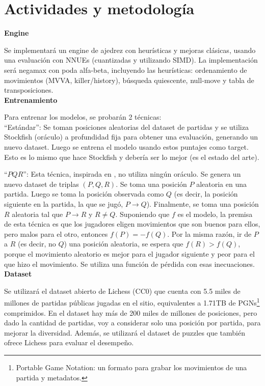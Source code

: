 \newpage
\section*{Actividades y metodología}

\textbf{Engine}

Se implementará un engine de ajedrez con heurísticas y mejoras clásicas, usando una evaluación con NNUEs (cuantizadas y utilizando SIMD). La implementación será negamax con poda alfa-beta, incluyendo las heurísticas: ordenamiento de movimientos (MVVA, killer/history), búsqueda quiescente, null-move y tabla de transposiciones. \\

\textbf{Entrenamiento}

Para entrenar los modelos, se probarán 2 técnicas: \\

``Estándar'': Se toman posiciones aleatorias del dataset de partidas y se utiliza Stockfish (oráculo) a profundidad fija para obtener una evaluación, generando un nuevo dataset. Luego se entrena el modelo usando estos puntajes como target. Esto es lo mismo que hace Stockfish y debería ser lo mejor (es el estado del arte).

``$PQR$'': Esta técnica, inspirada en \cite{dlchess:2014}, no utiliza ningún oráculo. Se genera un nuevo dataset de triplas $(P,Q,R)$. Se toma una posición $P$ aleatoria en una partida. Luego se toma la posición observada como $Q$ (es decir, la posición siguiente en la partida, la que se jugó, $P \rightarrow Q$). Finalmente, se toma una posición $R$ aleatoria tal que $P \rightarrow R$ y $R \neq Q$. Suponiendo que $f$ es el modelo, la premisa de esta técnica es que los jugadores eligen movimientos que son buenos para ellos, pero malos para el otro, entonces $f(P)=-f(Q)$. Por la misma razón, ir de $P$ a $R$ (es decir, no $Q$) una posición aleatoria, se espera que $f(R) > f(Q)$, porque el movimiento aleatorio es mejor para el jugador siguiente y peor para el que hizo el movimiento. Se utiliza una función de pérdida con esas inecuaciones. \\


\textbf{Dataset}

Se utilizará el dataset abierto de Lichess \cite{lichessdb} (CC0) que cuenta con 5.5 miles de millones de partidas públicas jugadas en el sitio, equivalentes a 1.71TB de PGNs\footnote[1]{Portable Game Notation: un formato para grabar los movimientos de una partida y metadatos.} comprimidos. En el dataset hay más de 200 miles de millones de posiciones, pero dado la cantidad de partidas, voy a considerar solo una posición por partida, para mejorar la diversidad. Además, se utilizará el dataset de puzzles que también ofrece Lichess para evaluar el desempeño.

